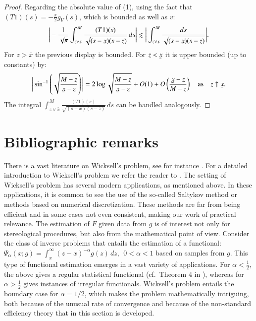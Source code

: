 \begin{proof}
Regarding the absolute value of (1), using the fact that $(T1)(s) = -\frac{\pi}{2}g_{\scriptscriptstyle{V}}(s)$, which is bounded as well as $v$:
\begin{align*}
    \bigg| -\frac{1}{\sqrt{\pi}}  \int_{z \vee \ubar{x}}^M \frac{(T1) (s)}{ \sqrt{ (s-\ubar{x})(s-z)}} \, ds \bigg| \lesssim  \bigg| \int_{z \vee \ubar{x}}^M \frac{ds}{ \sqrt{ (s-\ubar{x})(s-z)}}   \bigg|.
\end{align*}
For $z > \bar{x}$ the previous display is bounded. For $z < \ubar{x}$ it is upper bounded (up to constants) by:
\begin{align*}
    \bigg| \sin^{-1} \left( \sqrt{\frac{M-z}{\ubar{x}-z}} \right) \bigg| = 2 \log{\sqrt{\frac{M-z}{\ubar{x}-z}} } + O(1) + O\left( \frac{\ubar{x}-z}{M-z}\right) \quad \text{as} \quad z \uparrow \ubar{x}.
\end{align*}
The integral $ \int_{z \vee \bar{x}}^M \frac{(T1) (s)}{ \sqrt{ (s-\bar{x})(s-z)}} \, ds$ can be handled analogously. 


\end{proof}


\section{Bibliographic remarks}

There is a vast literature on Wicksell's problem, see for instance \cite{1,2,3,9,10, 15, 16, 17, 18, 19, 20}. For a detailed introduction to Wicksell's problem we refer the reader to \cite{9}. The setting of Wicksell's problem has several modern applications, as mentioned above. In these applications, it is common to see the use of the so-called Saltykov method or methods based on numerical discretization. These methods are far from being efficient and in some cases not even consistent, making our work of practical relevance. The estimation of $F$ given data from $g$ is of interest not only for stereological procedures, but also from the mathematical point of view. Consider the class of inverse problems that entails the estimation of a functional: $\Psi_\alpha(x ; g)=\int_x^{\infty}(z-x)^{-\alpha} g(z) \, dz, \: \: 0<\alpha<1$ based on samples from $g$. This type of functional estimation emerges in a vast variety of applications. For $\alpha < \frac{1}{2}$, the above gives a regular statistical functional (cf.\ Theorem 4 in \cite{30}), whereas for $\alpha>\frac{1}{2}$ gives instances of irregular functionals. Wicksell's problem entails the boundary case for $\alpha = 1/2$, which makes the problem mathematically intriguing, both because of the unusual rate of convergence and because of the non-standard efficiency theory that in this section is developed.

